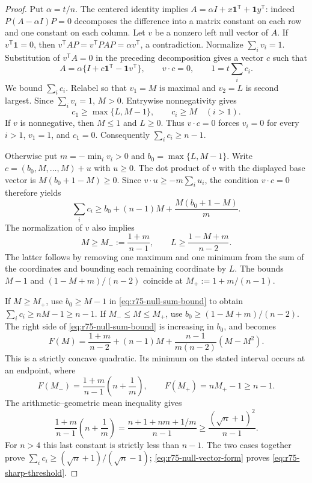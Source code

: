 \begin{proof}
Put $\alpha=t/n$. The centered identity implies
$A=\alpha I+x\mathbf1^{\mathsf T}+\mathbf1y^{\mathsf T}$:
indeed $P(A-\alpha I)P=0$ decomposes the difference into a matrix
constant on each row and one constant on each column. Let $v$ be a
nonzero left null vector of $A$. If $v^{\mathsf T}\mathbf1=0$,
then $v^{\mathsf T}AP=v^{\mathsf T}PAP=\alpha v^{\mathsf T}$,
a contradiction. Normalize $\sum_i v_i=1$. Substitution of
$v^{\mathsf T}A=0$ in the preceding decomposition gives a vector
$c$ such that
\begin{equation}\label{eq:r75-null-vector-form}
 A=\alpha\{I+c\mathbf1^{\mathsf T}-\mathbf1v^{\mathsf T}\},
 \qquad v\cdot c=0,
 \qquad 1=t\sum_i c_i.
\end{equation}
We bound $\sum_i c_i$. Relabel so that $v_1=M$ is maximal and
$v_2=L$ is second largest. Since $\sum_i v_i=1$, $M>0$.
Entrywise nonnegativity gives
\[
 c_1\ge\max\{L,M-1\},\qquad c_i\ge M\quad(i>1).
\]
If $v$ is nonnegative, then $M\le1$ and $L\ge0$.
Thus $v\cdot c=0$ forces $v_i=0$ for every $i>1$,
$v_1=1$, and $c_1=0$. Consequently $\sum_i c_i\ge n-1$.

Otherwise put $m=-\min_i v_i>0$ and
$b_0=\max\{L,M-1\}$. Write
$c=(b_0,M,\ldots,M)+u$ with $u\ge0$. The dot product of $v$
with the displayed base vector is $M(b_0+1-M)\ge0$.
Since $v\cdot u\ge-m\sum_i u_i$, the condition $v\cdot c=0$
therefore yields
\begin{equation}\label{eq:r75-null-sum-bound}
 \sum_i c_i\ge b_0+(n-1)M+
                       \frac{M(b_0+1-M)}m.
\end{equation}
The normalization of $v$ also implies
\[
 M\ge M_-:=\frac{1+m}{n-1},\qquad
 L\ge\frac{1-M+m}{n-2}.
\]
The latter follows by removing one maximum and one minimum from
the sum of the coordinates and bounding each remaining coordinate
by $L$. The bounds $M-1$ and $(1-M+m)/(n-2)$ coincide at
$M_+:=1+m/(n-1)$.

If $M\ge M_+$, use $b_0\ge M-1$ in
\eqref{eq:r75-null-sum-bound} to obtain
$\sum_i c_i\ge nM-1\ge n-1$. If $M_-\le M\le M_+$,
use $b_0\ge(1-M+m)/(n-2)$. The right side of
\eqref{eq:r75-null-sum-bound} is increasing in $b_0$, and becomes
\[
 F(M)=\frac{1+m}{n-2}+(n-1)M+
              \frac{n-1}{m(n-2)}(M-M^2).
\]
This is a strictly concave quadratic. Its minimum on the stated
interval occurs at an endpoint, where
\[
 F(M_-)=\frac{1+m}{n-1}\left(n+\frac1m\right),
 \qquad F(M_+)=nM_+-1\ge n-1.
\]
The arithmetic--geometric mean inequality gives
\[
 \frac{1+m}{n-1}\left(n+\frac1m\right)
 =\frac{n+1+nm+1/m}{n-1}
 \ge\frac{(\sqrt n+1)^2}{n-1}.
\]
For $n>4$ this last constant is strictly less than $n-1$.
The two cases together prove
$\sum_i c_i\ge(\sqrt n+1)/(\sqrt n-1)$;
\eqref{eq:r75-null-vector-form} proves \eqref{eq:r75-sharp-threshold}.


\end{proof}
